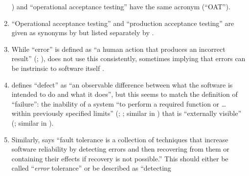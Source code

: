 \begin{enumerate}
          \citealp[pp.~1573\==1577, 1580]{YuEtAl2011}) and ``operational
          acceptance testing'' \citep[p.~30]{Firesmith2015} have the same
          acronym (``OAT'').
    \item %
          ``Operational acceptance testing'' and ``production acceptance
          testing'' are given as synonyms by \citetISTQB{} but listed
          separately by \citet[p.~30]{Firesmith2015}.
    \item %
          While ``error'' is defined as ``a human action that produces an
          incorrect result'' (\citealp[pp.~12\=/3]{SWEBOK2024};
          \citealp[p.~399]{vanVliet2000}), \citeauthor{SWEBOK2024} does not
          use this consistently, sometimes implying that errors can be instrinsic
          to software itself \citeyearpar[pp.~4\=/9, 6\=/5, 7\=/3, 12\=/4,
              12\=/9, 12\=/13]{SWEBOK2024}.
    \item %
           \citet[p.~1\=/1]{SWEBOK2024} defines ``defect'' as ``an
          observable difference between what the software is intended to do and
          what it does'', but this seems to match the definition of
          ``failure'': the inability of a system ``to perform a required
          function or \dots{} within previously specified limits''
          (\citealp[p.~7]{IEEE2019a}; \citeyear[p.~139]{IEEE2010}%
          ; similar in \citealp[p.~400]{vanVliet2000})
          that is ``externally visible'' (\citealp[p.~7]{IEEE2019a}; similar in
          \citealp[p.~400]{vanVliet2000}).
    \item %
          Similarly, \citet[p.~4\=/11]{SWEBOK2024} says ``fault tolerance is
          a collection of techniques that increase software reliability by
          detecting errors and then recovering from them or containing their
          effects if recovery is not possible.'' This should either be called
          ``\emph{error} tolerance'' or be described as ``detecting

\end{enumerate}
